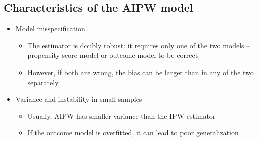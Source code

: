 \documentclass[10pt]{article}
\begin{document}
\subsection{Characteristics of the AIPW model}
\begin{itemize}
    \item Model misspecification
    \begin{itemize}
        \item The estimator is doubly robust: it requires only one of the two models -- propensity score model or outcome model to be correct 
        \item However, if both are wrong, the bias can be larger than in any of the two separately 
    \end{itemize}
    \item Variance and instability in small samples 
    \begin{itemize}
        \item Usually, AIPW has smaller variance than the IPW estimator 
        \item If the outcome model is overfitted, it can lead to poor generalization
    \end{itemize}
\end{itemize}
\end{document}
